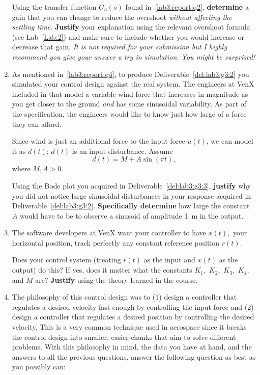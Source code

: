 \begin{deliverable}[label={lab3:report}]
\begin{enumerate}[label={(\arabic*)}]
{      Using the transfer function \(G_3(s)\) found in~\ref{lab3:report:q2}, \textbf{determine} a gain that you can change to reduce the overshoot \emph{without affecting the settling time}.
      \textbf{Justify} your explanation using the relevant overshoot formula (see Lab~\ref{Lab:2}) and make sure to include whether you would increase or decrease that gain.
      \emph{It is not required for your submission but I highly recommend you give your answer a try in simulation. You might be surprised!}
      \label{lab3:report:q4}
    }
    \item{%
      As mentioned in~\ref{lab3:report:q4}, to produce Deliverable~\ref{del:lab3:g3:2} you simulated your control design against the real system.
      The engineers at VenX included in that model a variable wind force that increases in magnitude as you get closer to the ground \emph{and} has some sinusoidal variability.
      As part of the specification, the engineers would like to know just how large of a force they can afford.

      Since wind is just an additional force to the input force \(u(t)\), we can model it as \(d(t)\);
      \(d(t)\) is an input disturbance.
      Assume
      \[
        d(t) = M + A\sin\left(\pi t\right),
      \]
      where \(M, A > 0\).

      Using the Bode plot you acquired in Deliverable~\ref{del:lab3:g3:3},
      \textbf{justify} why you did not notice large sinusoidal disturbances in your response acquired in Deliverable~\ref{del:lab3:g3:2}.
      \textbf{Specifically determine} how large the constant \(A\) would have to be to observe a sinusoid of amplitude \SI{1}{m} in the output.
      \label{lab3:report:q5}
    }
    \item{%
      The software developers at VenX want your controller to have \(x(t),\) your horizontal position, track perfectly any constant reference position \(r(t).\)

      Does your control system (treating \(r(t)\) as the input and \(x(t)\) as the output) do this?
      If yes, does it matter what the constants \(K_1,\) \(K_2,\) \(K_3,\) \(K_4,\) and \(M\) are?
      \textbf{Justify} using the theory learned in the course.
      \label{lab3:report:q6}
    }
    \item{%
      The philosophy of this control design was to (1) design a controller that regulates a desired velocity fast enough by controlling the input force and (2) design a controller that regulates a desired position by controlling the desired velocity.
      This is a very common technique used in aerospace since it breaks the control design into smaller, easier chunks that aim to solve different problems.
      With this philosophy in mind, the data you have at hand, and the answers to all the previous questions, answer the following question as best as you possibly can:

}
\end{enumerate}
\end{deliverable}
